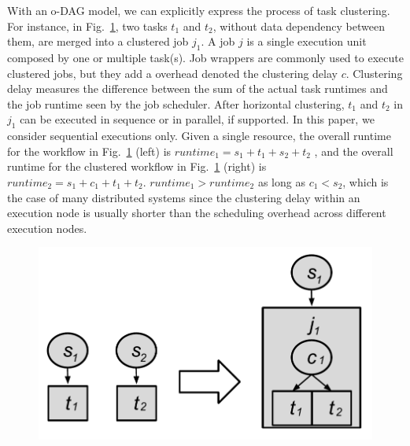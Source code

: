 \documentclass[final]{IEEEtran}
\begin{document}

With an o-DAG model, we can explicitly express the process of task clustering. For instance, in Fig.~\ref{fig:hc}, two tasks $t_1$ and $t_2$, without data dependency between them, are merged into a clustered job $j_1$. A job $j$ is a single execution unit composed by one or multiple task(s). Job wrappers are commonly used to execute clustered jobs, but they add a overhead denoted the clustering delay $c$. 
Clustering delay measures the difference between the sum of the actual task runtimes and the job runtime seen by the job scheduler. 
After horizontal clustering, $t_1$ and $t_2$ in $j_1$ can be executed in sequence or in parallel, if supported. In this paper, we consider sequential executions only. Given a single resource, the overall runtime for the workflow in Fig.~\ref{fig:hc} (left) is $runtime_1=s_1+t_1+s_2+t_2$ , and the overall runtime for the clustered workflow in Fig.~\ref{fig:hc} (right) is $runtime_2=s_1+c_1+t_1+t_2$.  $runtime_1 > runtime_2$ as long as $c_1 < s_2$, which is the case of many distributed systems since the clustering delay within an execution node is usually shorter than the scheduling overhead across different execution nodes.

\begin{figure}[htb]
\centering
 \includegraphics[width=0.65\linewidth]{figure/hc.pdf}
  \label{fig:hc}
  \vspace{-10pt}
\end{figure}
\end{document}
